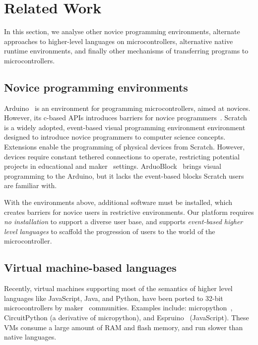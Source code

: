\section{Related Work}
\label{sec:related}
In this section, we analyse other novice programming environments, alternate approaches to higher-level languages on microcontrollers, alternative native runtime environments, and finally other mechanisms of transferring programs to microcontrollers.

\subsection{Novice programming environments}

Arduino~\cite{buildingArduino2014} is an environment for programming microcontrollers, aimed at novices. However, its c-based APIs introduces barriers for novice programmers~\cite{blikstein2013gears}. Scratch~\cite{ScratchCACM2009} is a widely adopted, event-based visual programming environment environment designed to introduce novice programmers to computer science concepts. Extensions enable the programming of physical devices from Scratch. However, devices require constant tethered connections to operate, restricting potential projects in educational and maker~\cite{dougherty2012maker} settings. ArduoBlock~\cite{Ardubloc28:online} brings visual programming to the Arduino, but it lacks the event-based blocks Scratch users are familiar with.

With the environments above, additional software must be installed, which creates barriers for novice users in restrictive environments. Our platform requires \emph{no installation} to support a diverse user base, and supports \emph{event-based higher level languages} to scaffold the progression of users to the world of the microcontroller.

\subsection{Virtual machine-based languages}

Recently, virtual machines supporting most of the semantics of higher level languages like JavaScript, Java, and Python, have been ported to 32-bit microcontrollers by maker~\cite{dougherty2012maker} communities. Examples include: micropython~\cite{MicroPython}, CircuitPython (a derivative of micropython), and Espruino~\cite{espruinoBook} (JavaScript). These VMs consume a large amount of RAM and flash memory, and run slower than native languages.

